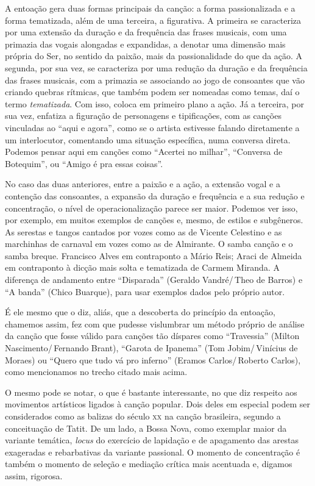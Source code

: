 A entoação gera duas formas principais da canção: a forma passionalizada
e a forma tematizada, além de uma terceira, a figurativa. A primeira se
caracteriza por uma extensão da duração e da frequência das frases
musicais, com uma primazia das vogais alongadas e expandidas, a denotar
uma dimensão mais própria do Ser, no sentido da paixão, mais da
passionalidade do que da ação. A segunda, por sua vez, se caracteriza
por uma redução da duração e da frequência das frases musicais, com a
primazia se associando ao jogo de consoantes que vão criando quebras
rítmicas, que também podem ser nomeadas como temas, daí o termo
\textit{tematizada}. Com isso, coloca em primeiro plano a ação. Já a terceira,
por sua vez, enfatiza a figuração de personagens e tipificações, com as
canções vinculadas ao ``aqui e agora'', como se o artista estivesse
falando diretamente a um interlocutor, comentando uma situação
específica, numa conversa direta. Podemos pensar aqui em canções como
``Acertei no milhar'', ``Conversa de Botequim'', ou ``Amigo é pra essas
coisas''.

No caso das duas anteriores, entre a paixão e a ação, a extensão vogal e
a contenção das consoantes, a expansão da duração e frequência e a sua
redução e concentração, o nível de operacionalização parece ser maior.
Podemos ver isso, por exemplo, em muitos exemplos de canções e, mesmo,
de estilos e subgêneros. As serestas e tangos cantados por vozes como as
de Vicente Celestino e as marchinhas de carnaval em vozes como as de
Almirante. O samba canção e o samba breque. Francisco Alves em
contraponto a Mário Reis; Araci de Almeida em contraponto à dicção mais
solta e tematizada de Carmem Miranda. A diferença de andamento entre
``Disparada'' (Geraldo Vandré/\,Theo de Barros) e ``A banda'' (Chico Buarque),
para usar exemplos dados pelo próprio autor.

É ele mesmo que o diz, aliás, que a descoberta do princípio da entoação,
chamemos assim, fez com que pudesse vislumbrar um método próprio de
análise da canção que fosse válido para canções tão díspares como
``Travessia'' (Milton Nascimento/\,Fernando Brant), ``Garota de Ipanema''
(Tom Jobim/\,Vinícius de Moraes) ou ``Quero que tudo vá pro inferno''
(Eramos Carlos/\,Roberto Carlos), como mencionamos no trecho citado mais
acima.

O mesmo pode se notar, o que é bastante interessante, no que diz
respeito aos movimentos artísticos ligados à canção popular. Dois deles
em especial podem ser considerados como as balizas do século \textsc{xx} na
canção brasileira, segundo a conceituação de Tatit. De um lado, a Bossa
Nova, como exemplar maior da variante temática, \emph{locus} do
exercício de lapidação e de apagamento das arestas exageradas e
rebarbativas da variante passional. O momento de concentração é também o
momento de seleção e mediação crítica mais acentuada e, digamos assim,
rigorosa.

